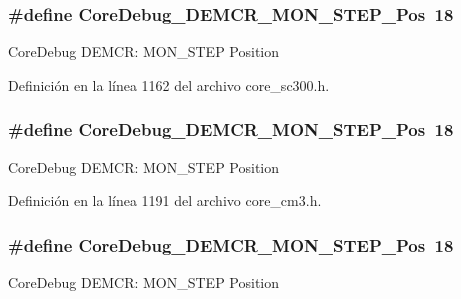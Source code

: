 \subsubsection[{\texorpdfstring{Core\+Debug\+\_\+\+D\+E\+M\+C\+R\+\_\+\+M\+O\+N\+\_\+\+S\+T\+E\+P\+\_\+\+Pos}{CoreDebug_DEMCR_MON_STEP_Pos}}]{\setlength{\rightskip}{0pt plus 5cm}\#define Core\+Debug\+\_\+\+D\+E\+M\+C\+R\+\_\+\+M\+O\+N\+\_\+\+S\+T\+E\+P\+\_\+\+Pos~18}\hypertarget{group___c_m_s_i_s___core_debug_ga9ae10710684e14a1a534e785ef390e1b}{}\label{group___c_m_s_i_s___core_debug_ga9ae10710684e14a1a534e785ef390e1b}
Core\+Debug D\+E\+M\+CR\+: M\+O\+N\+\_\+\+S\+T\+EP Position 

Definición en la línea 1162 del archivo core\+\_\+sc300.\+h.

\subsubsection[{\texorpdfstring{Core\+Debug\+\_\+\+D\+E\+M\+C\+R\+\_\+\+M\+O\+N\+\_\+\+S\+T\+E\+P\+\_\+\+Pos}{CoreDebug_DEMCR_MON_STEP_Pos}}]{\setlength{\rightskip}{0pt plus 5cm}\#define Core\+Debug\+\_\+\+D\+E\+M\+C\+R\+\_\+\+M\+O\+N\+\_\+\+S\+T\+E\+P\+\_\+\+Pos~18}\hypertarget{group___c_m_s_i_s___core_debug_ga9ae10710684e14a1a534e785ef390e1b}{}\label{group___c_m_s_i_s___core_debug_ga9ae10710684e14a1a534e785ef390e1b}
Core\+Debug D\+E\+M\+CR\+: M\+O\+N\+\_\+\+S\+T\+EP Position 

Definición en la línea 1191 del archivo core\+\_\+cm3.\+h.

\subsubsection[{\texorpdfstring{Core\+Debug\+\_\+\+D\+E\+M\+C\+R\+\_\+\+M\+O\+N\+\_\+\+S\+T\+E\+P\+\_\+\+Pos}{CoreDebug_DEMCR_MON_STEP_Pos}}]{\setlength{\rightskip}{0pt plus 5cm}\#define Core\+Debug\+\_\+\+D\+E\+M\+C\+R\+\_\+\+M\+O\+N\+\_\+\+S\+T\+E\+P\+\_\+\+Pos~18}\hypertarget{group___c_m_s_i_s___core_debug_ga9ae10710684e14a1a534e785ef390e1b}{}\label{group___c_m_s_i_s___core_debug_ga9ae10710684e14a1a534e785ef390e1b}
Core\+Debug D\+E\+M\+CR\+: M\+O\+N\+\_\+\+S\+T\+EP Position 

